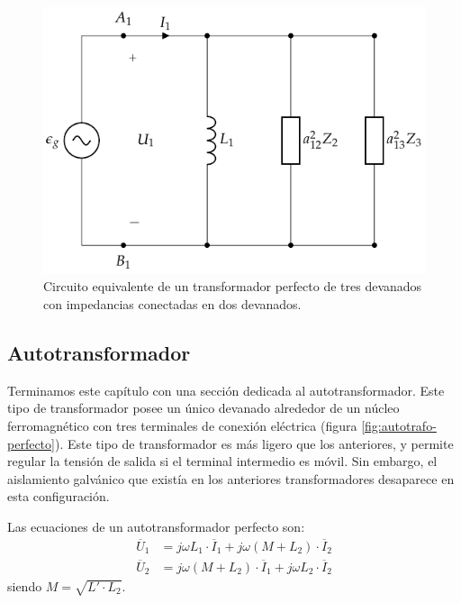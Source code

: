 \begin{figure}
  \centering
  \includegraphics[height=0.25\textheight]{../figs/TrafoPerfectoVariosDevanados_Impedancia_Equivalente.pdf}
  \caption{Circuito equivalente de un transformador perfecto de tres devanados con impedancias conectadas en dos devanados.}
  \label{fig:trafo-perfecto-ideal-varios-devanados-impedancia-equivalente}
\end{figure}

\subsection{Autotransformador}
\label{sec:autotrafo}

Terminamos este capítulo con una sección dedicada al autotransformador. Este tipo de transformador posee un único devanado alrededor de un núcleo ferromagnético con tres terminales de conexión eléctrica (figura \ref{fig:autotrafo-perfecto}). Este tipo de transformador es más ligero que los anteriores, y permite regular la tensión de salida si el terminal intermedio es móvil. Sin embargo, el aislamiento galvánico que existía en los anteriores transformadores desaparece en esta configuración.

Las ecuaciones de un autotransformador perfecto son:
\begin{align*}
  \overline{U}_1 &= j \omega L_1 \cdot \overline{I}_1 + j \omega (M + L_2) \cdot \overline{I}_2\\
  \overline{U}_2 &= j \omega (M + L_2) \cdot \overline{I}_1 + j \omega L_2 \cdot \overline{I}_2
\end{align*}
siendo $M = \sqrt{L' \cdot L_2}$.


